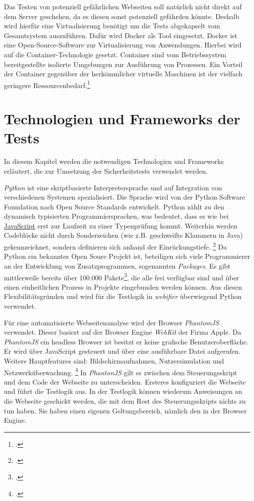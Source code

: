 Das Testen von potenziell gefährlichen Webseiten soll natürlich nicht direkt auf dem Server
geschehen, da es diesen sonst potenziell gefährden könnte. Deshalb wird hierfür eine
Virtualisierung benötigt um die Tests abgekapselt vom Gesamtsystem auszuführen. Dafür wird Docker
als Tool eingesetzt. Docker ist eine Open-Source-Software zur Virtualisierung von Anwendungen.
Hierbei wird auf die Container-Technologie gesetzt. Container sind vom Betriebssystem
bereitgestellte isolierte Umgebungen zur Ausführung von Prozessen. Ein Vorteil der Container
gegenüber der herkömmlicher virtuelle Maschinen ist der vielfach geringere Ressourcenbedarf.\footcite[Vgl.][]{docker}

\section{Technologien und Frameworks der Tests}

In diesem Kapitel werden die notwendigen Technologien und Frameworks erläutert, die zur Umsetzung
der Sicherheitstests verwendet werden.

\textit{Python} ist eine skriptbasierte Interpretersprache und auf Integration von
verschiedenen Systemen spezialisiert.
Die Sprache wird von der Python Software Foundation nach Open Source Standards entwickelt.
Python zählt zu den dynamisch typisierten Programmiersprachen, was bedeutet, dass es wie bei \hyperref[par:javascript]{JavaScript} erst zur Laufzeit zu einer Typenprüfung kommt.
Weiterhin werden Codeblöcke nicht durch Sonderzeichen (wie z.B. geschweifte Klammern in Java)
gekennzeichnet, sondern definieren sich anhand der Einrückungstiefe.
\footcite[Vgl.][]{pythonHomepage}
Da Python ein bekanntes Open Soure Projekt ist, beteiligen sich viele Programmierer an der Entwicklung von Zusatzprogrammen, sogenannten \textit{Packages}.
Es gibt mittlerweile bereits über 100.000 Pakete\footcite[Vgl.][]{pypi}, die alle frei verfügbar sind und über einen einheitlichen Prozess in Projekte eingebunden werden können.
Aus diesen Flexibilitätsgründen und wird für die Testlogik in \textit{webifier} überwiegend Python verwendet.

\label{par:phantomjs}
Für eine automatisierte Webseitenanalyse wird der Browser \textit{PhantomJS} verwendet.
Dieser basiert auf der Browser Engine \textit{WebKit} der Firma Apple.
Da \textit{PhantomJS} ein headless Browser ist besitzt er keine grafische Benutzeroberfläche.
Er wird über JavaScript gesteuert und über eine ausführbare Datei aufgerufen.
Weitere Hauptfeatures sind: Bildschirmaufnahmen, Nutzersimulation und Netzwerküberwachung.
\footcite[Vgl.][]{phantomjs}
In \textit{PhantonJS} gilt es zwischen dem Steuerungsskript und dem Code der Webseite
zu unterscheiden.
Ersteres konfiguriert die Webseite und führt die Testlogik aus.
In der Testlogik können wiederum Anweisungen an die Webseite geschickt werden, die mit dem Rest des
Steuerungsskripts nichts zu tun haben. Sie haben einen eigenen Geltungsbereich, nämlich den in der
Browser Engine.

